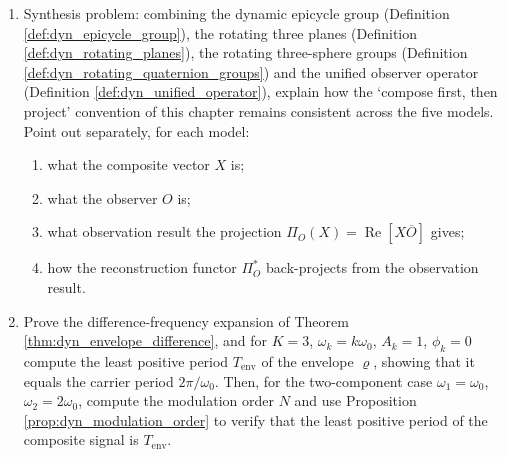 \begin{enumerate}[leftmargin=3em, label=\textbf{Exercise \arabic*}]
    \item Synthesis problem: combining the dynamic epicycle group (Definition \ref{def:dyn_epicycle_group}),
    the rotating three planes (Definition \ref{def:dyn_rotating_planes}),
    the rotating three-sphere groups (Definition \ref{def:dyn_rotating_quaternion_groups})
    and the unified observer operator (Definition \ref{def:dyn_unified_operator}),
    explain how the `compose first, then project' convention of this chapter remains consistent across the five models.
    Point out separately, for each model:
    \begin{enumerate}[label=(\roman*)]
        \item what the composite vector $X$ is;
        \item what the observer $O$ is;
        \item what observation result the projection $\Pi_O(X)=\operatorname{Re}[X\overline{O}]$ gives;
        \item how the reconstruction functor $\Pi_O^\ast$ back-projects from the observation result.
    \end{enumerate}

    \item Prove the difference-frequency expansion of Theorem \ref{thm:dyn_envelope_difference},
    and for $K=3$, $\omega_k=k\omega_0$, $A_k=1$, $\phi_k=0$ compute the least positive period $T_{\text{env}}$ of the envelope $\varrho$,
    showing that it equals the carrier period $2\pi/\omega_0$.
    Then, for the two-component case $\omega_1=\omega_0$, $\omega_2=2\omega_0$, compute the modulation order $N$
    and use Proposition \ref{prop:dyn_modulation_order} to verify that the least positive period of the composite signal is $T_{\text{env}}$.
\end{enumerate}

